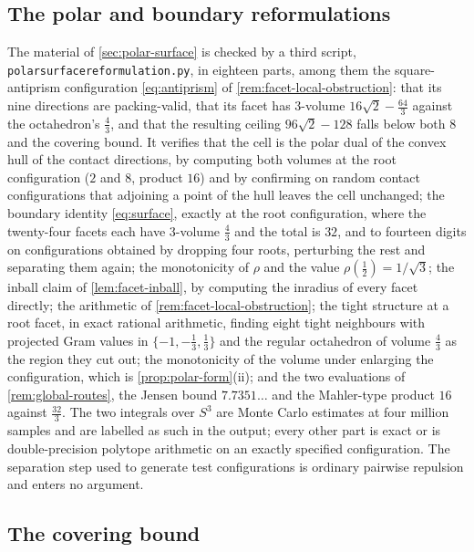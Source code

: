 \documentclass[11pt,reqno]{amsart}
\renewcommand{\_}{\origunderscore\allowbreak}
\numberwithin{equation}{section}
\theoremstyle{plain}
\theoremstyle{definition}
\theoremstyle{remark}
\begin{document}
\subsection*{The polar and boundary reformulations}

The material of \cref{sec:polar-surface} is checked by a third script,
\texttt{polar\_surface\_reformulation.py}, in eighteen parts, among
them the square-antiprism configuration \eqref{eq:antiprism} of
\cref{rem:facet-local-obstruction}: that its nine directions are
packing-valid, that its facet has $3$-volume $16\sqrt2-\tfrac{64}3$
against the octahedron's $\tfrac43$, and that the resulting ceiling
$96\sqrt2-128$ falls below both $8$ and the covering bound. It verifies
that the cell is the polar dual of the convex hull of the contact
directions, by computing both volumes at the root configuration
($2$ and $8$, product $16$) and by confirming on random contact
configurations that adjoining a point of the hull leaves the cell
unchanged; the boundary identity \eqref{eq:surface}, exactly at the root
configuration, where the twenty-four facets each have $3$-volume
$\tfrac43$ and the total is $32$, and to fourteen digits on
configurations obtained by dropping four roots, perturbing the rest and
separating them again; the monotonicity of $\rho$ and the value
$\rho(\tfrac12)=1/\sqrt3$; the inball claim of
\cref{lem:facet-inball}, by computing the inradius of every facet
directly; the arithmetic of \cref{rem:facet-local-obstruction}; the
tight structure at a root facet, in exact rational arithmetic, finding
eight tight neighbours with projected Gram values in
$\{-1,-\tfrac13,\tfrac13\}$ and the regular octahedron of volume
$\tfrac43$ as the region they cut out; the monotonicity of the volume
under enlarging the configuration, which is
\cref{prop:polar-form}(ii); and the two evaluations of
\cref{rem:global-routes}, the Jensen bound $7.7351\ldots$ and the
Mahler-type product $16$ against $\tfrac{32}3$. The two integrals over
$S^3$ are Monte Carlo estimates at four million samples and are labelled
as such in the output; every other part is exact or is double-precision
polytope arithmetic on an exactly specified configuration. The
separation step used to generate test configurations is ordinary
pairwise repulsion and enters no argument.

\subsection*{The covering bound}
\end{document}
